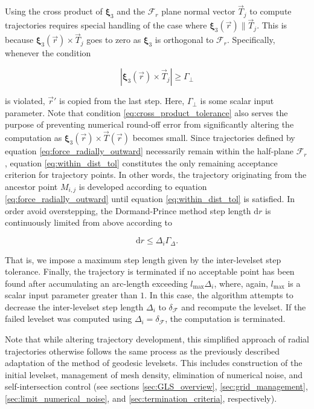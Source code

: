Using the cross product of $\bm{\xi}_3$ and the $\mathcal{F}_r$ plane normal vector $\vec{T}_j$ to compute trajectories requires special handling of the case where $\bm{\xi}_3(\vec{r}) \parallel \vec{T}_j$. This is because $\bm{\xi}_3(\vec{r}) \times \vec{T}_j$ goes to zero as $\bm{\xi}_3$ is orthogonal to $\mathcal{F}_r$. Specifically, whenever the condition

\begin{equation}\label{eq:cross_product_tolerance}
\left| \bm{\xi}_3(\vec{r}) \times \vec{T}_j\right| \geq \Gamma_{\perp}
\end{equation}

\noindent is violated, $\vec{r}'$ is copied from the last step. Here, $\Gamma_{\perp}$ is some scalar input parameter. Note that 
condition \eqref{eq:cross_product_tolerance} also serves the purpose of preventing numerical round-off error from significantly altering the computation as $\bm{\xi}_3(\vec{r}) \times \vec{T}(\vec{r})$ becomes small. Since trajectories defined by equation \eqref{eq:force_radially_outward} necessarily remain within the half-plane $\mathcal{F}_r$, equation \eqref{eq:within_dist_tol} constitutes the only remaining acceptance criterion for trajectory points. In other words, the trajectory originating from the ancestor point $M_{i,j}$ is developed according to equation \eqref{eq:force_radially_outward} until equation \eqref{eq:within_dist_tol} is satisfied. In order avoid overstepping, the Dormand-Prince method step length $\text{d}r$ is continuously limited from above according to

\begin{equation}
\text{d}r \leq \Delta_i\Gamma_{\Delta}.
\end{equation}

\noindent That is, we impose a maximum step length given by the inter-levelset step tolerance. Finally, the trajectory is terminated if no acceptable point has been found after accumulating an arc-length exceeding $l_{\text{max}}\Delta_i$, where, again, $l_{\text{max}}$ is a scalar input parameter greater than $1$. In this case, the algorithm attempts to decrease the inter-levelset step length $\Delta_i$ to $\delta_{\mathcal{F}}$ and recompute the levelset. If the failed levelset was computed using $\Delta_i=\delta_{\mathcal{F}}$, the computation is terminated.

Note that while altering trajectory development, this simplified approach of radial trajectories otherwise follows the same process as the previously described adaptation of the method of geodesic levelsets. This includes construction of the initial levelset, management of mesh density, elimination of numerical noise, and self-intersection control (see sections \ref{sec:GLS_overview}, \ref{sec:grid_management}, \ref{sec:limit_numerical_noise}, and \ref{sec:termination_criteria}, respectively). 

